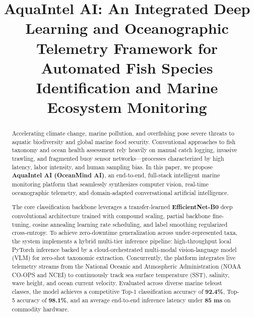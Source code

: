 \documentclass[conference]{IEEEtran}
\begin{document}
\title{AquaIntel AI: An Integrated Deep Learning and Oceanographic Telemetry Framework for Automated Fish Species Identification and Marine Ecosystem Monitoring}

\author{
\and
{}
\and
{}
}

\maketitle

\begin{abstract}
Accelerating climate change, marine pollution, and overfishing pose severe threats to aquatic biodiversity and global marine food security. Conventional approaches to fish taxonomy and ocean health assessment rely heavily on manual catch logging, invasive trawling, and fragmented buoy sensor networks---processes characterized by high latency, labor intensity, and human sampling bias. In this paper, we propose \textbf{AquaIntel AI (OceanMind AI)}, an end-to-end, full-stack intelligent marine monitoring platform that seamlessly synthesizes computer vision, real-time oceanographic telemetry, and domain-adapted conversational artificial intelligence. 

The core classification backbone leverages a transfer-learned \textbf{EfficientNet-B0} deep convolutional architecture trained with compound scaling, partial backbone fine-tuning, cosine annealing learning rate scheduling, and label smoothing regularized cross-entropy. To achieve zero-downtime generalization across under-represented taxa, the system implements a hybrid multi-tier inference pipeline: high-throughput local PyTorch inference backed by a cloud-orchestrated multi-modal vision-language model (VLM) for zero-shot taxonomic extraction. Concurrently, the platform integrates live telemetry streams from the National Oceanic and Atmospheric Administration (NOAA CO-OPS and NCEI) to continuously track sea surface temperature (SST), salinity, wave height, and ocean current velocity. Evaluated across diverse marine teleost classes, the model achieves a competitive Top-1 classification accuracy of \textbf{92.4\%}, Top-5 accuracy of \textbf{98.1\%}, and an average end-to-end inference latency under \textbf{85 ms} on commodity hardware.
\end{abstract}
\end{document}
